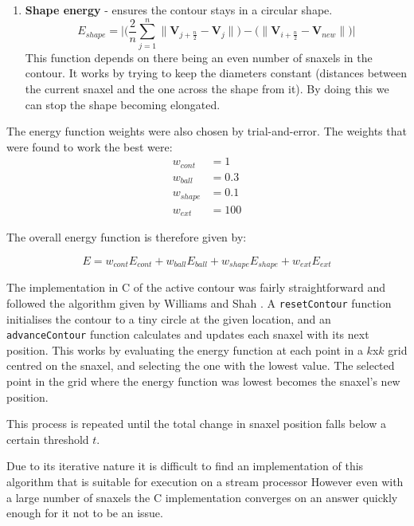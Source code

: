 \begin{enumerate}
	\item \textbf{Shape energy} - ensures the contour stays in a circular shape.
		\begin{equation}
			E_{shape} = \Bigg| \bigg( \frac{2}{n}\sum_{j=1}^n \| \mathbf{V}_{j+\frac{n}{2}} - \mathbf{V}_j \| \bigg) - \bigg( \| \mathbf{V}_{i+\frac{n}{2}} - \mathbf{V}_{new} \| \bigg) \Bigg|
		\end{equation}
		This function depends on there being an even number of snaxels in the contour.
		It works by trying to keep the diameters constant (distances between the current snaxel and the one across the shape from it).
		By doing this we can stop the shape becoming elongated.

\end{enumerate}

\noindent The energy function weights were also chosen by trial-and-error.
The weights that were found to work the best were:
\begin{align*}
	w_{cont} &= 1 \\
	w_{ball} &= 0.3 \\
	w_{shape} &= 0.1 \\
	w_{ext} &= 100
\end{align*}

The overall energy function is therefore given by:

\begin{equation}
	E = w_{cont} E_{cont} + w_{ball} E_{ball} + w_{shape} E_{shape} + w_{ext} E_{ext}
\end{equation}

\bigskip
\noindent The implementation in C of the active contour was fairly straightforward and followed the algorithm given by Williams and Shah \cite{SnakeAlgorithm}.
A \texttt{resetContour} function initialises the contour to a tiny circle at the given location,
and an \texttt{advanceContour} function calculates and updates each snaxel with its next position.
This works by evaluating the energy function at each point in a $k$x$k$ grid centred on the snaxel,
and selecting the one with the lowest value.
The selected point in the grid where the energy function was lowest becomes the snaxel's new position.

This process is repeated until the total change in snaxel position falls below a certain threshold $t$.

Due to its iterative nature it is difficult to find an implementation of this algorithm that is suitable for execution on a stream processor 
However even with a large number of snaxels the C implementation converges on an answer quickly enough for it not to be an issue.

